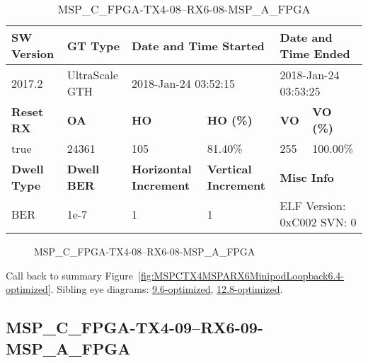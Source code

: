 \begin{table}[h]
\centering
\caption{MSP\_C\_FPGA-TX4-08--RX6-08-MSP\_A\_FPGA}
\label{tab:MSPCFPGATX408RX608MSPAFPGA6.4-optimized}
\begin{tabular}{@{}|l|l|l|l|l|l|@{}}
\toprule
\textbf{SW Version}                & \textbf{GT Type}   & \multicolumn{2}{l|}{\textbf{Date and Time Started}}            & \multicolumn{2}{l|}{\textbf{Date and Time Ended}}        \\ \midrule
2017.2                       & UltraScale GTH          & \multicolumn{2}{l|}{2018-Jan-24 03:52:15}                   & \multicolumn{2}{l|}{2018-Jan-24 03:53:25}               \\ \midrule
\textbf{Reset RX}                  & \textbf{OA} & \textbf{HO}   & \textbf{HO (\%)} & \textbf{VO} & \textbf{VO (\%)} \\ \midrule
true & 24361        & 105          & 81.40\%        & 255        & 100.00\%       \\ \midrule
\textbf{Dwell Type}                & \textbf{Dwell BER} & \textbf{Horizontal Increment} & \textbf{Vertical Increment}    & \multicolumn{2}{l|}{\textbf{Misc Info}}                  \\ \midrule
BER                            & 1e-7        & 1        & 1           & \multicolumn{2}{l|}{ELF Version: 0xC002 SVN: 0}                         \\ \bottomrule
\end{tabular}
\end{table}

\begin{figure}[h]
\caption{MSP\_C\_FPGA-TX4-08--RX6-08-MSP\_A\_FPGA} \label{fig:MSPCFPGATX408RX608MSPAFPGA6.4-optimized}
\end{figure}

Call back to summary Figure~\ref{fig:MSPCTX4MSPARX6MinipodLoopback6.4-optimized}.
Sibling eye diagrams: \hyperref[sec:MSPCFPGATX408RX608MSPAFPGA9.6-optimized]{9.6-optimized}, \hyperref[sec:MSPCFPGATX408RX608MSPAFPGA12.8-optimized]{12.8-optimized}.

\clearpage
\newpage


\subsection{MSP\_C\_FPGA-TX4-09--RX6-09-MSP\_A\_FPGA}\label{sec:MSPCFPGATX409RX609MSPAFPGA6.4-optimized}


